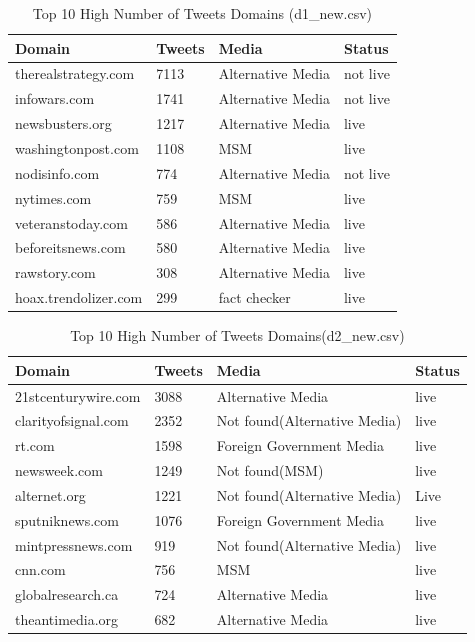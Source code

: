 \documentclass[12pt]{article}
\begin{document}
\begin{table}[ht]
\centering
\caption{Top 10 High Number of Tweets Domains (d1\_new.csv)}
\label{tbl}
\begin{tabular}{|l|l|l|l|}
\hline
\textbf{Domain} & \textbf{Tweets} & \textbf{Media} & \textbf{Status} \\ \hline \hline
therealstrategy.com & 7113 & Alternative Media & not live \\ \hline
infowars.com & 1741 & Alternative Media & not live \\ \hline
newsbusters.org & 1217 & Alternative Media & live \\ \hline
washingtonpost.com & 1108 & MSM & live \\ \hline
nodisinfo.com & 774 & Alternative Media & not live \\ \hline
nytimes.com & 759 & MSM & live \\ \hline
veteranstoday.com & 586 & Alternative Media & live \\ \hline
beforeitsnews.com & 580 & Alternative Media & live \\ \hline
rawstory.com & 308 & Alternative Media & live \\ \hline
hoax.trendolizer.com & 299 & fact checker & live \\ \hline
\end{tabular}
\end{table}

\begin{table}[ht]
\centering
\caption{Top 10 High Number of Tweets Domains(d2\_new.csv)}
\label{tb2}
\begin{tabular}{|l|l|l|l|}
\hline
\textbf{Domain} & \textbf{Tweets} & \textbf{Media} & \textbf{Status} \\ \hline \hline
21stcenturywire.com & 3088 & Alternative Media & live \\ \hline
clarityofsignal.com & 2352 & Not found(Alternative Media) & live \\ \hline
rt.com & 1598 & Foreign Government Media & live \\ \hline
newsweek.com & 1249 & Not found(MSM) & live \\ \hline
alternet.org & 1221 & Not found(Alternative Media) & Live \\ \hline
sputniknews.com & 1076 & Foreign Government Media & live \\ \hline
mintpressnews.com & 919 & Not found(Alternative Media) & live \\ \hline
cnn.com & 756 & MSM & live \\ \hline
globalresearch.ca & 724 & Alternative Media & live \\ \hline
theantimedia.org & 682 & Alternative Media & live \\ \hline
\end{tabular}
\end{table}
\end{document}
